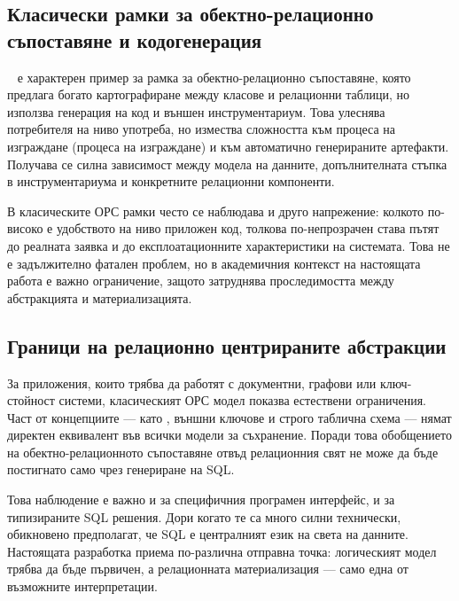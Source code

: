 \subsection{Класически рамки за обектно-релационно съпоставяне и кодогенерация}

~\cite{odb} е характерен пример за рамка за обектно-релационно съпоставяне, която предлага богато картографиране между класове и релационни таблици, но използва генерация на код и външен инструментариум. Това улеснява потребителя на ниво употреба, но измества сложността към процеса на изграждане (процеса на изграждане) и към автоматично генерираните артефакти. Получава се силна зависимост между модела на данните, допълнителната стъпка в инструментариума и конкретните релационни компоненти.

В класическите ОРС рамки често се наблюдава и друго напрежение: колкото по-високо е удобството на ниво приложен код, толкова по-непрозрачен става пътят до реалната заявка и до експлоатационните характеристики на системата. Това не е задължително фатален проблем, но в академичния контекст на настоящата работа е важно ограничение, защото затруднява проследимостта между абстракцията и материализацията.

\subsection{Граници на релационно центрираните абстракции}

За приложения, които трябва да работят с документни, графови или ключ-стойност системи, класическият ОРС модел показва естествени ограничения. Част от концепциите --- като , външни ключове и строго таблична схема --- нямат директен еквивалент във всички модели за съхранение. Поради това обобщението на обектно-релационното съпоставяне отвъд релационния свят не може да бъде постигнато само чрез генериране на SQL.

Това наблюдение е важно и за специфичния програмен интерфейс, и за типизираните SQL решения. Дори когато те са много силни технически, обикновено предполагат, че SQL е централният език на света на данните. Настоящата разработка приема по-различна отправна точка: логическият модел трябва да бъде първичен, а релационната материализация --- само една от възможните интерпретации.

